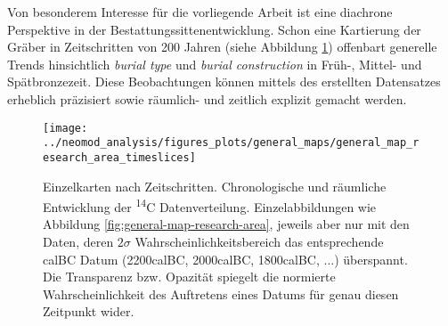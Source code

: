 \documentclass[openany,twoside,twocolumn]{book}
\begin{document}
Von besonderem Interesse für die vorliegende Arbeit ist eine diachrone Perspektive in der Bestattungssittenentwicklung. Schon eine Kartierung der Gräber in Zeitschritten von 200 Jahren (siehe Abbildung \ref{fig:general-map-research-area-timeslices}) offenbart generelle Trends hinsichtlich \emph{burial type} und \emph{burial construction} in Früh-, Mittel- und Spätbronzezeit. Diese Beobachtungen können mittels des erstellten Datensatzes erheblich präzisiert sowie räumlich- und zeitlich explizit gemacht werden.

\begin{landscape}
\begin{figure}
\texttt{[image: ../neomod\_analysis/figures\_plots/general\_maps/general\_map\_research\_area\_timeslices]} \caption[Einzelkarten nach Zeitschritten]{Einzelkarten nach Zeitschritten. Chronologische und räumliche Entwicklung der \textsuperscript{14}C Datenverteilung. Einzelabbildungen wie Abbildung \ref{fig:general-map-research-area}, jeweils aber nur mit den Daten, deren $2\sigma$ Wahrscheinlichkeitsbereich das entsprechende calBC Datum (2200calBC, 2000calBC, 1800calBC, ...) überspannt. Die Transparenz bzw. Opazität spiegelt die normierte Wahrscheinlichkeit des Auftretens eines Datums für genau diesen Zeitpunkt wider.}\label{fig:general-map-research-area-timeslices}
\end{figure}
\end{landscape}
\end{document}
